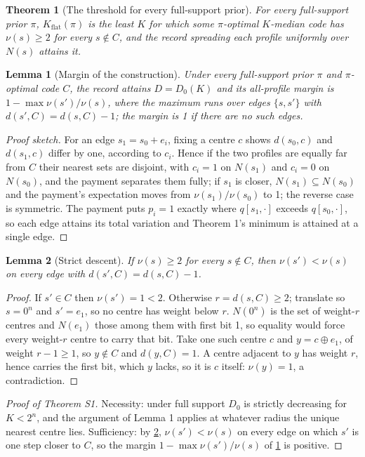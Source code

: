 \documentclass[sigconf,anonymous,acmthm=false]{acmart}
\theoremstyle{acmplain}
\newtheorem{slemma}{Lemma}
\newtheorem{stheorem}{Theorem}
\theoremstyle{acmdefinition}
\newcommand{\Kflat}{K_{\mathrm{flat}}}
\begin{document}
\begin{stheorem}[The threshold for every full-support prior]\label{thm:prior}
For every full-support prior $\pi$, $\Kflat(\pi)$ is the least $K$ for which some
$\pi$-optimal $K$-median code has $\nu(s)\ge2$ for every $s\notin C$, and the record spreading
each profile uniformly over $N(s)$ attains it.
\end{stheorem}

\begin{slemma}[Margin of the construction]\label{lem:gen-margin}
Under every full-support prior $\pi$ and $\pi$-optimal code $C$, the record attains
$D=D_0(K)$ and its all-profile margin is $1-\max\nu(s')/\nu(s)$, where the maximum runs over
edges $\{s,s'\}$ with $d(s',C)=d(s,C)-1$; the margin is 1 if there are no such edges.
\end{slemma}
\begin{proof}[Proof sketch]
For an edge $s_1=s_0+e_i$, fixing a centre $c$ shows $d(s_0,c)$ and $d(s_1,c)$ differ by
one, according to $c_i$. Hence if the two profiles are equally far from $C$ their nearest
sets are disjoint, with $c_i=1$ on $N(s_1)$ and $c_i=0$ on $N(s_0)$, and the payment
separates them fully; if $s_1$ is closer, $N(s_1)\subseteq N(s_0)$ and the payment's
expectation moves from $\nu(s_1)/\nu(s_0)$ to 1; the reverse case is symmetric. The payment
puts $p_i=1$ exactly where $q[s_1,\cdot]$ exceeds $q[s_0,\cdot]$, so each edge attains its
total variation and Theorem 1's minimum is attained at a single edge.
\end{proof}

\begin{slemma}[Strict descent]\label{lem:strict-descent}
If $\nu(s)\ge2$ for every $s\notin C$, then $\nu(s')<\nu(s)$ on every edge with
$d(s',C)=d(s,C)-1$.
\end{slemma}
\begin{proof}
If $s'\in C$ then $\nu(s')=1<2$. Otherwise $r=d(s,C)\ge2$; translate so $s=0^n$ and
$s'=e_1$, so no centre has weight below $r$. $N(0^n)$ is the set of weight-$r$ centres and
$N(e_1)$ those among them with first bit 1, so equality would force every weight-$r$ centre
to carry that bit. Take one such centre $c$ and $y=c\oplus e_1$, of weight $r-1\ge1$, so
$y\notin C$ and $d(y,C)=1$. A centre adjacent to $y$ has weight $r$, hence carries the first
bit, which $y$ lacks, so it is $c$ itself: $\nu(y)=1$, a contradiction.
\end{proof}

\begin{proof}[Proof of Theorem S1]
Necessity: under full support $D_0$ is strictly decreasing for $K<2^n$, and the argument of
Lemma 1 applies at whatever radius the unique nearest centre lies. Sufficiency: by
\cref{lem:strict-descent}, $\nu(s')<\nu(s)$ on every edge on which $s'$ is one step closer to
$C$, so the margin $1-\max\nu(s')/\nu(s)$ of \cref{lem:gen-margin} is positive.
\end{proof}
\end{document}
